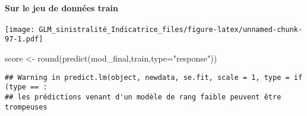 \documentclass[
]{article}
\newenvironment{Shaded}{\begin{snugshade}}{\end{snugshade}}
\newcommand{\AttributeTok}[1]{\textcolor[rgb]{0.77,0.63,0.00}{#1}}
\newcommand{\FunctionTok}[1]{\textcolor[rgb]{0.00,0.00,0.00}{#1}}
\newcommand{\NormalTok}[1]{#1}
\newcommand{\OtherTok}[1]{\textcolor[rgb]{0.56,0.35,0.01}{#1}}
\newcommand{\SpecialCharTok}[1]{\textcolor[rgb]{0.00,0.00,0.00}{#1}}
\newcommand{\StringTok}[1]{\textcolor[rgb]{0.31,0.60,0.02}{#1}}
\begin{document}
\hypertarget{sur-le-jeu-de-donnuxe9es-train-2}{%
\paragraph{Sur le jeu de données
train}\label{sur-le-jeu-de-donnuxe9es-train-2}}

\begin{Shaded}
\end{Shaded}

\texttt{[image: GLM\_sinistralité\_Indicatrice\_files/figure-latex/unnamed-chunk-97-1.pdf]}

\begin{Shaded}
\begin{Highlighting}[]
\NormalTok{score }\OtherTok{\textless{}{-}} \FunctionTok{round}\NormalTok{(}\FunctionTok{predict}\NormalTok{(mod\_final,train,}\AttributeTok{type=}\StringTok{"response"}\NormalTok{))}
\end{Highlighting}
\end{Shaded}

\begin{verbatim}
## Warning in predict.lm(object, newdata, se.fit, scale = 1, type = if (type == :
## les prédictions venant d'un modèle de rang faible peuvent être trompeuses
\end{verbatim}

\begin{Shaded}
\end{Shaded}
\end{document}
